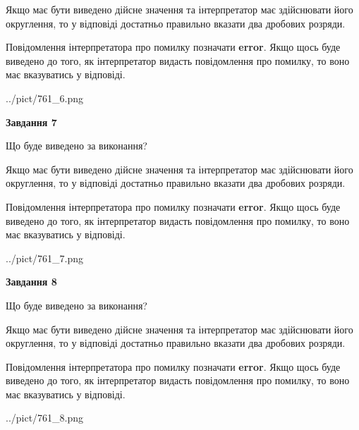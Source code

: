 \documentclass[12pt, ukrainian]{article}
\begin{document}
{\begin {Large}
Якщо має бути виведено дійсне значення та інтерпретатор має здійснювати його округлення, 
то у відповіді достатньо правильно вказати два дробових розряди.

Повідомлення інтерпретатора про помилку позначати \textbf{error}.
Якщо щось буде виведено до того, як інтерпретатор видасть повідомлення про помилку, 
то воно має вказуватись у відповіді. \par

\begin{center}
	{../pict/761_6.png}
\end{center}
\newpage

{\begin {center}\textbf{Завдання 7}\end {center}}\par
Що буде виведено за виконання? \par

Якщо має бути виведено дійсне значення та інтерпретатор має здійснювати його округлення, 
то у відповіді достатньо правильно вказати два дробових розряди.

Повідомлення інтерпретатора про помилку позначати \textbf{error}.
Якщо щось буде виведено до того, як інтерпретатор видасть повідомлення про помилку, 
то воно має вказуватись у відповіді. \par

\begin{center}
	{../pict/761_7.png}
\end{center}
\newpage

{\begin {center}\textbf{Завдання 8}\end {center}}\par
Що буде виведено за виконання? \par

Якщо має бути виведено дійсне значення та інтерпретатор має здійснювати його округлення, 
то у відповіді достатньо правильно вказати два дробових розряди.

Повідомлення інтерпретатора про помилку позначати \textbf{error}.
Якщо щось буде виведено до того, як інтерпретатор видасть повідомлення про помилку, 
то воно має вказуватись у відповіді. \par

\begin{center}
	{../pict/761_8.png}
\end{center}
\newpage


\end{Large}}
\end{document}
